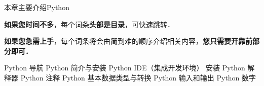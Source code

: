 
本章主要介绍Python

\textbf{如果您时间不多}，每个词条\textbf{头部是目录}，可快速跳转．

\textbf{如果您急需上手}，每个词条将会由简到难的顺序介绍相关内容，\textbf{您只需要开靠前部分即可．}

Python 导航
Python 简介与安装
Python IDE（集成开发环境） 安装
Python 解释器
Python 注释
Python 基本数据类型与转换
Python 输入和输出
Python 数字
